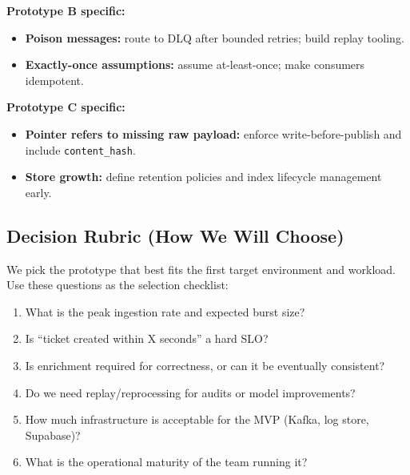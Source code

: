 \textbf{Prototype B specific:}
\begin{itemize}
  \item \textbf{Poison messages:} route to DLQ after bounded retries; build replay tooling.
  \item \textbf{Exactly-once assumptions:} assume at-least-once; make consumers idempotent.
\end{itemize}

\textbf{Prototype C specific:}
\begin{itemize}
  \item \textbf{Pointer refers to missing raw payload:} enforce write-before-publish and include \texttt{content\_hash}.
  \item \textbf{Store growth:} define retention policies and index lifecycle management early.
\end{itemize}

\subsection{Decision Rubric (How We Will Choose)}
We pick the prototype that best fits the first target environment and workload.
Use these questions as the selection checklist:
\begin{enumerate}
  \item What is the peak ingestion rate and expected burst size?
  \item Is ``ticket created within X seconds'' a hard SLO?
  \item Is enrichment required for correctness, or can it be eventually consistent?
  \item Do we need replay/reprocessing for audits or model improvements?
  \item How much infrastructure is acceptable for the MVP (Kafka, log store, Supabase)?
  \item What is the operational maturity of the team running it?
\end{enumerate}
